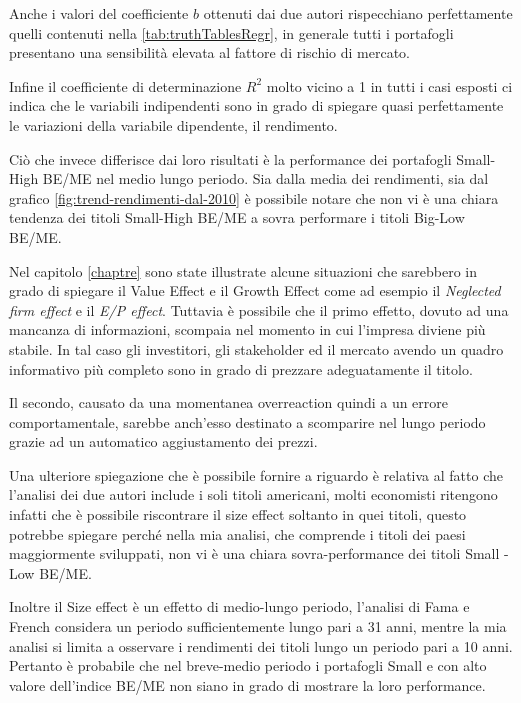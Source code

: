 Anche i valori del coefficiente $b$ ottenuti dai due autori rispecchiano perfettamente quelli contenuti nella \ref{tab:truthTablesRegr}, in generale tutti i portafogli presentano una sensibilità elevata al fattore di rischio di mercato.

Infine il coefficiente di determinazione $R^2$ molto vicino a 1 in tutti i casi esposti ci indica che le variabili indipendenti sono in grado di spiegare quasi perfettamente le variazioni della variabile dipendente, il rendimento. 

Ciò che invece differisce dai loro risultati è la performance dei portafogli Small-High BE/ME nel medio lungo periodo. Sia dalla media dei rendimenti, sia dal grafico \ref{fig:trend-rendimenti-dal-2010} è possibile notare che non vi è una chiara tendenza dei titoli Small-High BE/ME a sovra performare i titoli Big-Low BE/ME. 

Nel capitolo \ref{chaptre} sono state illustrate alcune situazioni che sarebbero in grado di spiegare il Value Effect e il Growth Effect come ad esempio il \textit{Neglected firm effect} e il \textit{E/P effect}. Tuttavia è possibile che il primo effetto, dovuto ad una mancanza di informazioni, scompaia nel momento in cui l'impresa diviene più stabile. In tal caso gli investitori, gli stakeholder ed il mercato avendo un quadro informativo più completo sono in grado di prezzare adeguatamente il titolo. 

Il secondo, causato da una momentanea overreaction quindi a un errore comportamentale, sarebbe anch'esso destinato a scomparire nel lungo periodo grazie ad un automatico aggiustamento dei prezzi. 

Una ulteriore spiegazione che è possibile fornire a riguardo è relativa al fatto che l'analisi dei due autori include i soli titoli americani, molti economisti ritengono infatti che è possibile riscontrare il size effect soltanto in quei titoli, questo potrebbe spiegare perché nella mia analisi, che comprende i titoli dei paesi maggiormente sviluppati, non vi è una chiara sovra-performance dei titoli Small - Low BE/ME.

Inoltre il Size effect è un effetto di medio-lungo periodo, l'analisi di Fama e French considera un periodo sufficientemente lungo pari a 31 anni, mentre la mia analisi si limita a osservare i rendimenti dei titoli lungo un periodo pari a 10 anni. Pertanto è probabile che nel breve-medio periodo i portafogli Small e con alto valore dell'indice BE/ME non siano in grado di mostrare la loro performance. 

